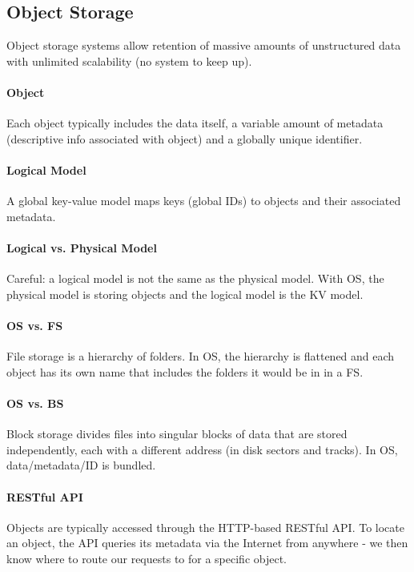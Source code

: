 \subsection{Object Storage}

Object storage systems allow retention of massive amounts of unstructured data with unlimited scalability (no system to keep up).

\paragraph{Object}
Each object typically includes the data itself, a variable amount of metadata (descriptive info associated with object) and a globally unique identifier.

\paragraph{Logical Model}
A global key-value model maps keys (global IDs) to objects and their associated metadata.

\paragraph{Logical vs. Physical Model}
Careful: a logical model is not the same as the physical model. With OS, the physical model is storing objects and the logical model is the KV model.

\paragraph{OS vs. FS}
File storage is a hierarchy of folders. In OS, the hierarchy is flattened and each object has its own name that includes the folders it would be in in a FS.

\paragraph{OS vs. BS}
Block storage divides files into singular blocks of data that are stored independently, each with a different address (in disk sectors and tracks). In OS, data/metadata/ID is bundled.

\paragraph{RESTful API}
Objects are typically accessed through the HTTP-based RESTful API. To locate an object, the API queries its metadata via the Internet from anywhere - we then know where to route our requests to for a specific object.

